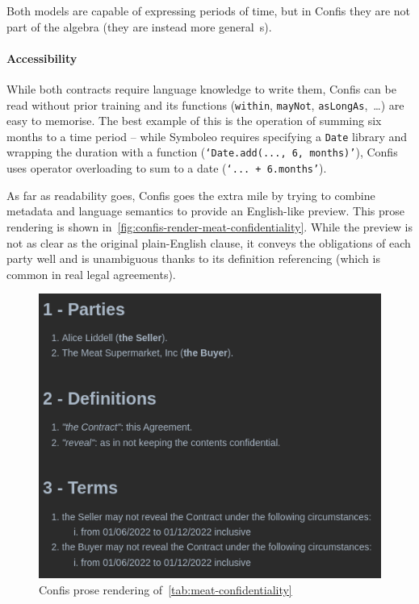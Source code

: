 Both models are capable of expressing periods of time, but in Confis they are not part of the algebra (they are instead more general~s).

\paragraph{Accessibility} While both contracts require language knowledge to write them, Confis can be read without prior training and its functions (\texttt{within}, \texttt{mayNot}, \texttt{asLongAs},~\dots) are easy to memorise.
The best example of this is the operation of summing six months to a time period -- while Symboleo requires specifying a \texttt{Date} library and wrapping the duration with a function (\texttt{`Date.add(..., 6, months)'}), Confis uses operator overloading to sum to a date (\texttt{`... + 6.months'}).

As far as readability goes, Confis goes the extra mile by trying to combine metadata and language semantics to provide an English-like preview.
This prose rendering is shown in~\autoref{fig:confis-render-meat-confidentiality}.
While the preview is not as clear as the original plain-English clause, it conveys the obligations of each party well and is unambiguous thanks to its definition referencing (which is common in real legal agreements).

\begin{figure}[h]
    \centering
    \includegraphics[width=0.8\columnwidth]{figures/confis.meat.prose}
    \caption{Confis prose rendering of~\autoref{tab:meat-confidentiality}}
    \label{fig:confis-render-meat-confidentiality}
\end{figure}


